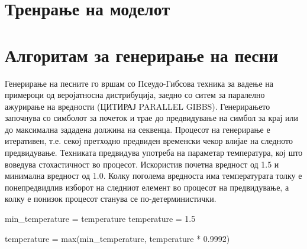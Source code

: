 \section{Тренрање на моделот}



\section{Алгоритам за генерирање на песни}

Генерирање на песните го вршам со Псеудо-Гибсова техника за вадење на примероци од веројатносна дистрибуција, заедно со ситем за паралелно ажурирање на вредности (ЦИТИРАЈ PARALLEL GIBBS). Генерирањето започнува со симболот за почеток и трае до предвидување на симбол за крај или до максимална зададена должина на секвенца. Процесот на генерирање е итеративен, т.е. секој претходно предвиден временски чекор влијае на следното предвидување. Техниката предвидува употреба на параметар температура, кој што воведува стохастичност во процесот. Искористив почетна вредност од 1.5 и минимална вредност од 1.0. Колку поголема вредноста има температурата толку е понепредвидлив изборот на следниот елемент во процесот на предвидување, а колку е понизок процесот станува се по-детерминистички. 

min_temperature = temperature
temperature = 1.5
    
 temperature = max(min_temperature, temperature * 0.9992)

